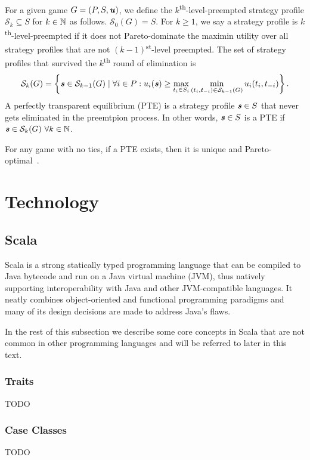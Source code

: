 \begin{definition}
  For a given game $G = (P, S, \boldsymbol{\mathit{u}})$, we define the $k$\textsuperscript{th}-level-preempted strategy profile $\mathcal{S}_k \subseteq S$ for $k \in \mathbb{N}$ as follows.
  $\mathcal{S}_0(G) = S$.
  For $k \ge 1$, we say a strategy profile is $k$\textsuperscript{th}-level-preempted if it does not Pareto-dominate the maximin utility over all strategy profiles that are not $(k-1)$\textsuperscript{st}-level preempted.
  The set of strategy profiles that survived the $k$\textsuperscript{th} round of elimination is
  \[
    \mathcal{S}_k(G) = \left\{\boldsymbol{\mathit{s}} \in \mathcal{S}_{k-1}(G) \mid \forall i \in P: u_i(\boldsymbol{\mathit{s}}) \ge \max_{t_i \in S_i}\min_{(t_i, \boldsymbol{\mathit{t}}_{-i}) \in \mathcal{S}_{k-1}(G)} u_i(t_i, t_{-i})\right\}.
  \]
  A perfectly transparent equilibrium (PTE) is a strategy profile $\boldsymbol{\mathit{s}} \in S$ that never gets eliminated in the preemtpion process.
  In other words, $\boldsymbol{\mathit{s}} \in S$ is a PTE if $\boldsymbol{\mathit{s}} \in \mathcal{S}_k(G)\ \forall k \in \mathbb{N}$.
\end{definition}

For any game with no ties, if a PTE exists, then it is unique and Pareto-optimal~\cite{Fourny20}.


\section{Technology}

\subsection{Scala}
Scala is a strong statically typed programming language that can be compiled to Java bytecode and run on a Java virtual machine (JVM), thus natively supporting interoperability with Java and other JVM-compatible languages.
It neatly combines object-oriented and functional programming paradigms and many of its design decisions are made to address Java's flaws.

In the rest of this subsection we describe some core concepts in Scala that are not common in other programming languages and will be referred to later in this text.

\subsubsection{Traits}
TODO

\subsubsection{Case Classes}
TODO

